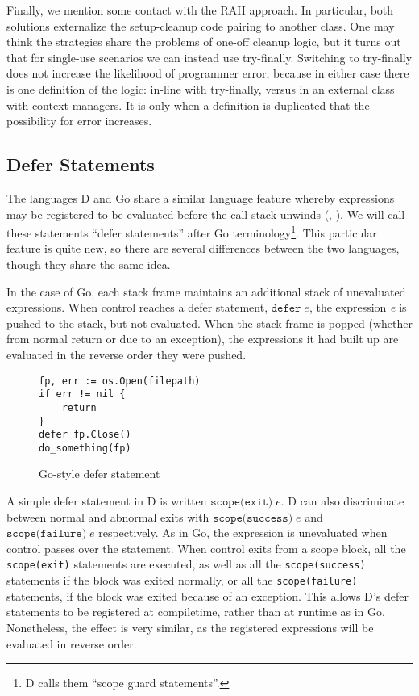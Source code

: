 \documentclass[11pt]{article}
\newcommand{\maybePage}{\null}
\begin{document}
Finally, we mention some contact with the RAII approach.
In particular, both solutions externalize the setup-cleanup code pairing to another class.
One may think the strategies share the problems of one-off cleanup logic, but it turns out that for single-use scenarios we can instead use try-finally.
Switching to try-finally does not increase the likelihood of programmer error, because in either case there is one definition of the logic: in-line with try-finally, versus in an external class with context managers.
It is only when a definition is duplicated that the possibility for error increases.


\maybePage
\subsection{Defer Statements}
\label{defer}

The languages D and Go share a similar language feature whereby expressions may be registered to be evaluated before the call stack unwinds (\cite{DReference}, \cite{GoLanguage}). We will call these statements ``defer statements'' after Go terminology\footnote{D calls them ``scope guard statements''.}. This particular feature is quite new, so there are several differences between the two languages, though they share the same idea.

In the case of Go, each stack frame maintains an additional stack of unevaluated expressions. When control reaches a defer statement, $\texttt{defer}\;e$, the expression \textit{e} is pushed to the stack, but not evaluated. When the stack frame is popped (whether from normal return or due to an exception), the expressions it had built up are evaluated in the reverse order they were pushed.

\begin{figure}[H]
\caption{Go-style defer statement}
\label{goDeferStatement}
\begin{verbatim}
fp, err := os.Open(filepath)
if err != nil {
    return
}
defer fp.Close()
do_something(fp)
\end{verbatim}
\end{figure}

A simple defer statement in D is written $\texttt{scope(exit)}\;e$.
D can also discriminate between normal and abnormal exits with $\texttt{scope(success)}\;e$ and $\texttt{scope(failure)}\;e$ respectively.
As in Go, the expression is unevaluated when control passes over the statement.
When control exits from a scope block, all the \texttt{scope(exit)} statements are executed, as well as all the \texttt{scope(success)} statements if the block was exited normally, or all the \texttt{scope(failure)} statements, if the block was exited because of an exception.
This allows D's defer statements to be registered at compiletime, rather than at runtime as in Go.
Nonetheless, the effect is very similar, as the registered expressions will be evaluated in reverse order.
\end{document}
